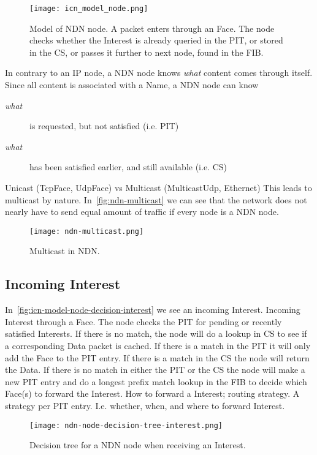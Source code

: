 \begin{figure}[H]
  \centering
  \texttt{[image: icn\_model\_node.png]}
  \caption{Model of NDN node. A packet enters through an Face. 
  The node checks whether the Interest is already queried in the PIT, or stored in the CS, or passes it further to next node, found in the FIB.}
  \label{fig:icn-model-node}
\end{figure}

In contrary to an \gls{IP} node, a \gls{NDN} node knows \textit{what} content comes through itself. 
Since all content is associated with a Name, a \gls{NDN} node can know 
\begin{description}
  \item[\textit{what}] is requested, but not satisfied (i.e. \gls{PIT})
  \item[\textit{what}] has been satisfied earlier, and still available (i.e. \gls{CS})
\end{description}

Unicast (TcpFace, UdpFace) vs Multicast (MulticastUdp, Ethernet)
This leads to multicast by nature.
In~\autoref{fig:ndn-multicast} we can see that the network does not nearly have to send equal amount of traffic if every node is a \gls{NDN} node.
\begin{figure}[H]
  \centering
  \texttt{[image: ndn-multicast.png]}
  \caption{Multicast in NDN.}
  \label{fig:ndn-multicast}
\end{figure}
 
\subsection{Incoming Interest}\label{incoming-interest}
In~\autoref{fig:icn-model-node-decision-interest} we see an incoming Interest.
Incoming Interest through a Face. The node checks the \gls{PIT} for pending or recently satisfied Interests. 
If there is no match, the node will do a lookup in \gls{CS} to see if a corresponding Data packet is cached. 
If there is a match in the \gls{PIT} it will only add the Face to the \gls{PIT} entry. If there is a match in the \gls{CS} the node will return the Data. 
If there is no match in either the \gls{PIT} or the \gls{CS} the node will make a new \gls{PIT} entry and do a longest prefix match lookup in the \gls{FIB} to decide which Face(s) to forward the Interest. 
How to forward a Interest; routing strategy. 
A strategy per \gls{PIT} entry. 
I.e. whether, when, and where to forward Interest.
\begin{figure}[H]
  \centering
  \texttt{[image: ndn-node-decision-tree-interest.png]}
  \caption{Decision tree for a NDN node when receiving an Interest.}
  \label{fig:icn-model-node-decision-interest}
\end{figure}


